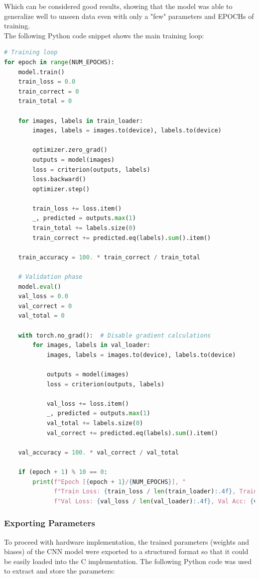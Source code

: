 \documentclass{article}
\begin{document}
Which can be considered good results, showing that the model was able to generalize well to unseen data even with only a "few" parameters and EPOCHs of training.\\

The following Python code snippet shows the main training loop:

\begin{lstlisting}[language=Python]
# Training loop
for epoch in range(NUM_EPOCHS):
    model.train()
    train_loss = 0.0
    train_correct = 0
    train_total = 0

    for images, labels in train_loader:
        images, labels = images.to(device), labels.to(device)

        optimizer.zero_grad()
        outputs = model(images)
        loss = criterion(outputs, labels)
        loss.backward()
        optimizer.step()

        train_loss += loss.item()
        _, predicted = outputs.max(1)
        train_total += labels.size(0)
        train_correct += predicted.eq(labels).sum().item()

    train_accuracy = 100. * train_correct / train_total

    # Validation phase
    model.eval()
    val_loss = 0.0
    val_correct = 0
    val_total = 0

    with torch.no_grad():  # Disable gradient calculations
        for images, labels in val_loader:
            images, labels = images.to(device), labels.to(device)

            outputs = model(images)
            loss = criterion(outputs, labels)

            val_loss += loss.item()
            _, predicted = outputs.max(1)
            val_total += labels.size(0)
            val_correct += predicted.eq(labels).sum().item()

    val_accuracy = 100. * val_correct / val_total

    if (epoch + 1) % 10 == 0:
        print(f"Epoch [{epoch + 1}/{NUM_EPOCHS}], "
              f"Train Loss: {train_loss / len(train_loader):.4f}, Train Acc: {train_accuracy:.2f}%, "
              f"Val Loss: {val_loss / len(val_loader):.4f}, Val Acc: {val_accuracy:.2f}%")
\end{lstlisting}



\subsubsection{Exporting Parameters}
To proceed with hardware implementation, the trained parameters (weights and biases) of the CNN model were exported to a structured format so that it could be easily loaded into the C implementation.
The following Python code was used to extract and store the parameters:
\end{document}
